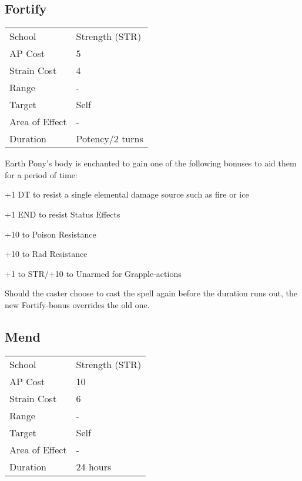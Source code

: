 \documentclass[11pt,a4paper,twocolumn]{book}
\begin{document}
\subsection*{Fortify}
{
	\begin{tabu} to 75mm{| X[l,4] | X[l,7] |}
		\hline
		School 			& Strength (STR) 	\\
		AP Cost	      	& 5 				\\
		Strain Cost     & 4 				\\
		Range     		& - 				\\
		Target      	& Self 				\\
		Area of Effect  & - 	 			\\
		Duration     	& Potency/2 turns 	\\ \hline
	\end{tabu}
	
}

\medskip

Earth Pony's body is enchanted to gain one of the following bonuses to aid them for a period of time:

\medskip
\begin{compactitem}
	\item +1 DT to resist a single elemental damage source such as fire or ice
	\item +1 END to resist Status Effects
	\item +10 to Poison Resistance
	\item +10 to Rad Resistance
	\item +1 to STR/+10 to Unarmed for Grapple-actions
\end{compactitem}
\medskip

Should the caster choose to cast the spell again before the duration runs out, the new Fortify-bonus overrides the old one.

\bigskip

\subsection*{Mend}
{
	\begin{tabu} to 75mm{| X[l,4] | X[l,7] |}
		\hline
		School 			& Strength (STR) 	\\
		AP Cost	      	& 10 				\\
		Strain Cost     & 6 				\\
		Range     		& - 				\\
		Target      	& Self 				\\
		Area of Effect  & - 	 			\\
		Duration     	& 24 hours 			\\ \hline
	\end{tabu}
	
}
\end{document}

